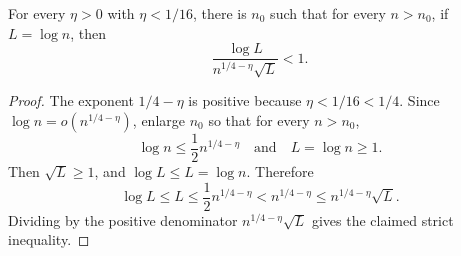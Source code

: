 \begin{helper}
For every \(\eta>0\) with \(\eta<1/16\), there is \(n_0\) such that for
every \(n>n_0\), if \(L=\log n\), then
\[
\frac{\log L}{n^{1/4-\eta}\sqrt L}<1.
\]
\end{helper}
\begin{proof}
The exponent \(1/4-\eta\) is positive because \(\eta<1/16<1/4\).
Since \(\log n=o(n^{1/4-\eta})\), enlarge \(n_0\) so that for every
\(n>n_0\),
\[
\log n\le \frac12 n^{1/4-\eta}
\quad\text{and}\quad
L=\log n\ge1.
\]
Then \(\sqrt L\ge1\), and \(\log L\le L=\log n\).  Therefore
\[
\log L\le L\le \frac12 n^{1/4-\eta}
< n^{1/4-\eta}\le n^{1/4-\eta}\sqrt L.
\]
Dividing by the positive denominator \(n^{1/4-\eta}\sqrt L\) gives the
claimed strict inequality.
\end{proof}
